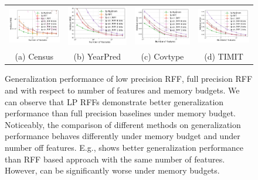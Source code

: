\begin{figure}
\begin{tabular}{c@{\hskip 0in}c@{\hskip 0in}c@{\hskip 0in}c}
		\includegraphics[width=0.3\linewidth]{figures/census_MSE_vs_n_feat_all_line.pdf} &
		\includegraphics[width=0.3\linewidth]{figures/yearpred_MSE_vs_n_feat_all_line.pdf} &
		\includegraphics[width=0.3\linewidth]{figures/covtype_error_vs_n_feat_all_line.pdf} &
		\includegraphics[width=0.3\linewidth]{figures/timit_error_vs_n_feat_all_line.pdf} \\
		(a) Census & (b) YearPred & (c) Covtype & (d) TIMIT \\
	\end{tabular}
	\caption{Generalization performance of low precision RFF, full precision RFF and \Nystrom with respect to number of features and memory budgets. We can observe that LP RFFs demonstrate better generalization performance than full precision baselines under memory budget. Noticeably, the comparison of different methods on generalization performance behaves differently under memory budget and under number off features. E.g., \Nystrom shows better generalization performance than RFF based approach with the same number of features. However, \Nystrom can be significantly worse under memory budgets.}
	\label{fig:generalization_col_app}
\end{figure}

